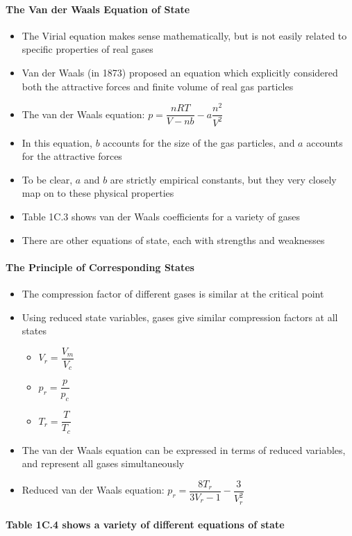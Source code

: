 \documentclass[12pt, openany, letterpaper]{memoir}
\begin{document}
\paragraph{The Van der Waals Equation of State}
\begin{itemize}
	\item The Virial equation makes sense mathematically, but is not easily related to specific properties of real gases
	\item Van der Waals (in 1873) proposed an equation which explicitly considered both the attractive forces and finite volume of real gas particles
	\item The van der Waals equation: $p=\dfrac{nRT}{V-nb}-a\dfrac{n^2}{V^2}$
	\item In this equation, $b$ accounts for the size of the gas particles, and $a$ accounts for the attractive forces
	\item To be clear, $a$ and $b$ are strictly empirical constants, but they very closely map on to these physical properties
	\item Table 1C.3 shows van der Waals coefficients for a variety of gases
	\item There are other equations of state, each with strengths and weaknesses
\end{itemize}
\paragraph{The Principle of Corresponding States}
\begin{itemize}
	\item The compression factor of different gases is similar at the critical point
	\item Using reduced state variables, gases give similar compression factors at all states
	\begin{itemize}
		\item $V_r = \dfrac{V_m}{V_c}$
		\item $p_r=\dfrac{p}{p_c}$
		\item $T_r=\dfrac{T}{T_c}$
	\end{itemize}
	\item The van der Waals equation can be expressed in terms of reduced variables, and represent all gases simultaneously
	\item Reduced van der Waals equation: $p_r = \dfrac{8T_r}{3V_r-1}-\dfrac{3}{V_r^2}$
\end{itemize}
\paragraph{Table 1C.4 shows a variety of different equations of state}
\end{document}
